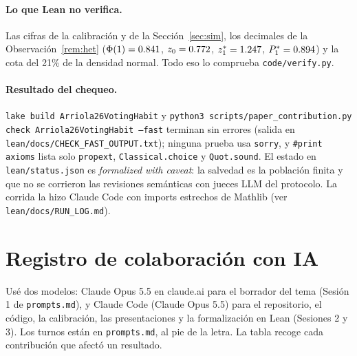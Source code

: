 \documentclass[11pt]{article}
\theoremstyle{definition}
\newcommand{\1}{\mathbbm{1}}
\begin{document}
\paragraph{Lo que Lean no verifica.} Las cifras de la calibración y de la Sección~\ref{sec:sim}, los
decimales de la Observación~\ref{rem:het} ($\Phi(1)=0.841$, $z_0=0.772$, $z_1^*=1.247$,
$P_1^*=0.894$) y la cota del 21\% de la densidad normal. Todo eso lo comprueba
\texttt{code/verify.py}.

\paragraph{Resultado del chequeo.} \texttt{lake build Arriola26VotingHabit} y
\texttt{python3 scripts/paper\_contribution.py check Arriola26VotingHabit --fast} terminan sin
errores (salida en \texttt{lean/docs/CHECK\_FAST\_OUTPUT.txt}); ninguna prueba usa \texttt{sorry}, y
\texttt{\#print axioms} lista solo \texttt{propext}, \texttt{Classical.choice} y
\texttt{Quot.sound}. El estado en \texttt{lean/status.json} es \emph{formalized with caveat}: la
salvedad es la población finita y que no se corrieron las revisiones semánticas con jueces LLM del
protocolo. La corrida la hizo Claude Code con imports estrechos de Mathlib (ver
\texttt{lean/docs/RUN\_LOG.md}).

\section{Registro de colaboración con IA}\label{app:ai}

Usé dos modelos: Claude Opus 5.5 en claude.ai para el borrador del tema (Sesión 1 de
\texttt{prompts.md}), y Claude Code (Claude Opus 5.5) para el repositorio, el código, la
calibración, las presentaciones y la formalización en Lean (Sesiones 2 y 3). Los turnos están en
\texttt{prompts.md}, al pie de la letra. La tabla recoge cada contribución que afectó un resultado.
\end{document}

